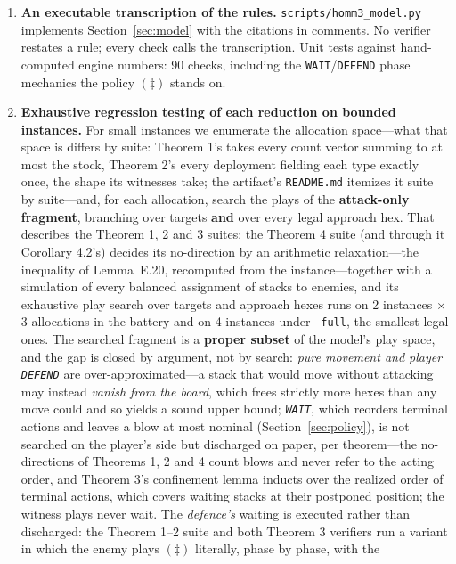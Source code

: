 \documentclass[11pt,a4paper]{article}
\theoremstyle{plain}
\theoremstyle{definition}
\theoremstyle{plain}
\theoremstyle{definition}
\theoremstyle{remark}
\newcommand{\src}[1]{\texttt{#1}}
\begin{document}
\begin{enumerate}
\item \textbf{An executable transcription of the rules.} \src{scripts/homm3\_model.py}
  implements Section~\ref{sec:model} with the citations in comments. No verifier restates a
  rule; every check calls the transcription. Unit tests against hand-computed engine numbers:
  90 checks, including the \texttt{WAIT}/\texttt{DEFEND} phase mechanics the policy
  $(\ddagger)$ stands on.
\item \textbf{Exhaustive regression testing of each reduction on bounded instances.} For small
  instances we enumerate the allocation space---what that space is differs by suite:
  Theorem 1's takes every count vector summing to at most the stock, Theorem 2's every
  deployment fielding each type exactly once, the shape its witnesses take; the artifact's
  \src{README.md} itemizes it suite by suite---and, for each allocation, search the plays
  of the \textbf{attack-only fragment}, branching over targets \textbf{and} over every
  legal approach hex. That describes the Theorem 1, 2 and 3 suites; the Theorem 4 suite (and
  through it Corollary 4.2's) decides its no-direction by an arithmetic relaxation---the
  inequality of Lemma~E.20, recomputed from the instance---together with a simulation of
  every balanced assignment of stacks to enemies, and its exhaustive play search over targets
  and approach hexes runs on 2 instances $\times$ 3 allocations in the battery and on 4
  instances under \src{--full}, the smallest legal ones. The searched fragment is a
  \textbf{proper subset} of the model's play space, and the gap is closed by argument, not by search: \emph{pure movement and player
  \texttt{DEFEND}} are over-approximated---a stack that would move without attacking may
  instead \emph{vanish from the board}, which frees strictly more hexes than any move could
  and so yields a sound upper bound; \emph{\texttt{WAIT}}, which reorders terminal actions
  and leaves a blow at most nominal (Section~\ref{sec:policy}), is not searched on the
  player's side but discharged on paper, per theorem---the no-directions of Theorems 1, 2
  and 4 count blows and never refer to the acting order, and Theorem 3's confinement lemma
  inducts over the realized order of terminal actions, which covers waiting stacks at their
  postponed position; the witness plays never wait. The \emph{defence's} waiting is
  executed rather than discharged: the Theorem 1--2 suite and both Theorem 3 verifiers run
  a variant in which the enemy plays $(\ddagger)$ literally, phase by phase, with the

\end{enumerate}
\end{document}
